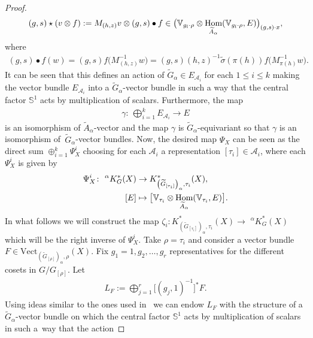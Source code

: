 \documentclass[pdftex]{sigma}
\def\S{\mathbb{S}}
\def\V{\mathbb{V}}
\DeclareMathOperator{\Hom}{\textup{Hom}}
\theoremstyle{definition}
\numberwithin{equation}{section}
\begin{document}
\begin{proof}
\begin{gather*}
(g,s)\star (v\otimes f):=M_{(h,z)}v\otimes (g,s)\bullet
f \in \big(\V_{g_{l}\cdot\rho}\otimes
\Hom_{\widetilde{A}_{\alpha}}(\V_{g_{l}\cdot\rho},E)\big)_{(g,s)\cdot x},
\end{gather*}
where
\begin{gather*}
(g,s)\bullet f(w)=(g,s)f\big(M_{(h,z)}^{-1}w\big)
=(g,s)(h,z)^{-1}\tilde{\sigma}(\pi(h))f\big(M_{\pi(h)}^{-1}w\big).
\end{gather*}
It can be seen that this defines an action of $\widetilde{G}_{\alpha}\in E_{\mathcal{A}_{i}}$
for each $1\leq i\leq k$ making the vector bundle $E_{\mathcal{A}_{i}}$
into a $\widetilde{G}_{\alpha}$-vector bundle in such a way that the central factor
$\S^{1}$ acts by multiplication of scalars. Furthermore, the map
\begin{gather*}
\gamma\colon\ \bigoplus_{i=1}^{k}E_{\mathcal{A}_{i}} \rightarrow E
\end{gather*}
is an isomorphism of $\widetilde{A}_{\alpha}$-vector and the map $\gamma$ is
$\widetilde{G}_{\alpha}$-equivariant so that $\gamma$ is an isomorphism of~$\widetilde{G}_{\alpha}$-vector bundles. Now, the desired map $\Psi_{X}$ can be seen as the
direct sum $\oplus_{i=1}^{k}\Psi_{X}^{i}$ choosing for each $\mathcal{A}_{i}$ a representation
$[\tau_{i}]\in\mathcal{A}_{i}$, where each $\Psi_{X}^{i}$ is given by
\begin{align*}
\Psi_{X}^{i}\colon \phantom{i}^{\alpha}K_{G}^{\ast}(X)&\rightarrow
K^{*}_{\left(\widetilde{G}_{[\tau_{i}]}\right)_{\alpha},\tau_{i}}(X),
\\
[E]&\mapsto \big[\V_{\tau_{i}}\otimes\Hom_{\widetilde{A}_{\alpha}}(\V_{\tau_{i}},E)\big].
\end{align*}
In what follows we will construct the map
$\zeta_{i}\colon K^{*}_{\left(\widetilde{G}_{[\tau_{i}]}\right)_{\alpha},\tau_{i}}(X)
\rightarrow \phantom{i}^{\alpha}K_{G}^{\ast}(X)$
which will be the right inverse of $\Psi_{X}^{i}$. Take $\rho=\tau_{i}$ and consider
a vector bundle $F\in\text{Vect}_{\left(\widetilde{G}_{[\rho]}\right)_{\alpha},\rho}(X)$.
Fix $g_{1}=1,g_{2},\dots,g_{r}$ representatives for the different cosets in $G/G_{[\rho]}$.
Let
\begin{gather*}
L_{F}:=\bigoplus_{j=1}^{r}\big[(g_{j},1)^{-1}\big]^{\ast} F.
\end{gather*}
Using ideas similar to the ones used in~\cite[Theorem 3.1]{GomezUribe} we can endow $L_{F}$
with the structure of a $\widetilde{G}_{\alpha}$-vector bundle on which the
central factor $\S^{1}$ acts by multiplication of scalars in such a~way that the action

\end{proof}
\end{document}
